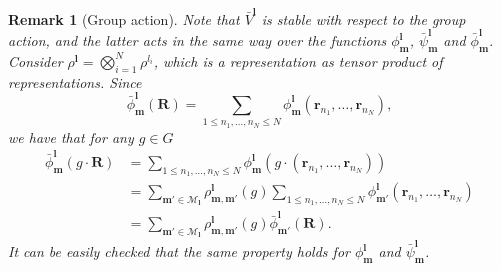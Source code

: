 \documentclass{article}
\newcommand{\rep}[2]{\rho^{#1}_{#2}}
\newcommand{\bphi}[2]{\bar\phi^{#1}_{#2}}
\newcommand{\bpsi}[2]{\bar\psi^{#1}_{#2}}
\newcommand{\bV}{{\bar V}}
\newtheorem{remark}[theorem]{Remark}
\numberwithin{equation}{section}
\def\br{{\bm r}}
\def\bl{{\bm l}}
\def\bbm{{\bm m}}
\def\bR{{\bm R}}
\def\calM{\mathcal{M}}
\def\Nat{{N}}
\begin{document}
\begin{remark}[Group action]
\label{rem:group_action}
Note that $\bV^\bl$ is stable with respect to the group action, and the latter acts in the same way over the functions $\phi^\bl_\bbm$, 
 $\bpsi{\bl}{\bbm}$ and $\bphi{\bl}{\bbm}$. Consider $\rep{\bl}{}=\displaystyle\bigotimes_{i=1}^\Nat\rep{l_i}{}$, which is a representation as tensor product of representations. Since
    \[
        \bphi{\bl}{\bbm}(\bR)=\sum_{1\le n_1,\ldots,n_\Nat\le\Nat}\phi^\bl_\bbm(\br_{n_1},\ldots,\br_{n_\Nat}),
    \]
    we have that for any $g\in G$
    \begin{align*}
          \bphi{\bl}{\bbm}(g \cdot \bR)&=\sum_{1\le  n_1,\ldots,n_\Nat\le\Nat}\phi^\bl_\bbm(g \cdot (\br_{n_1},\ldots,\br_{n_\Nat}))\\
          &= \sum_{\bbm'\in \calM_\bl}\rep{\bl}{\bbm,\bbm'}(g)\sum_{1\le n_1,\ldots,n_\Nat\le\Nat}\phi^\bl_{\bbm'}(\br_{n_1},\ldots,\br_{n_\Nat})\\
          &= \sum_{\bbm'\in \calM_\bl}\rep{\bl}{\bbm,\bbm'}(g)\bphi{\bl}{\bbm'}(\bR).
    \end{align*}
It can be easily checked that the same property holds for $\phi^\bl_\bbm$ and $\bpsi{\bl}{\bbm}$.
\end{remark}
\end{document}
